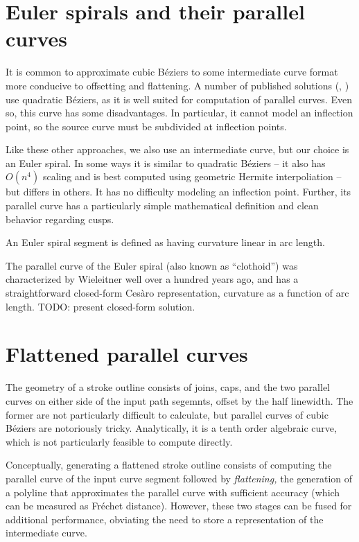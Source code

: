 \documentclass[sigconf, authordraft]{acmart}
\begin{document}
\section{Euler spirals and their parallel curves}

It is common to approximate cubic Béziers to some intermediate curve format more conducive to offsetting and flattening. A number of published solutions (\cite{Yzerman2020}, \cite{Nehab2020}) use quadratic Béziers, as it is well suited for computation of parallel curves. Even so, this curve has some disadvantages. In particular, it cannot model an inflection point, so the source curve must be subdivided at inflection points.

Like these other approaches, we also use an intermediate curve, but our choice is an Euler spiral. In some ways it is similar to quadratic Béziers -- it also has $O(n^4)$ scaling and is best computed using geometric Hermite interpoliation -- but differs in others. It has no difficulty modeling an inflection point. Further, its parallel curve has a particularly simple mathematical definition and clean behavior regarding cusps.

An Euler spiral segment is defined as having curvature linear in arc length.

The parallel curve of the Euler spiral (also known as ``clothoid'') was characterized by Wieleitner well over a hundred years ago\cite{Wieleitner1907}, and has a straightforward closed-form Cesàro representation, curvature as a function of arc length. TODO: present closed-form solution.

\section{Flattened parallel curves}

The geometry of a stroke outline consists of joins, caps, and the two parallel curves on either side of the input path segemnts, offset by the half linewidth. The former are not particularly difficult to calculate, but parallel curves of cubic Béziers are notoriously tricky. Analytically, it is a tenth order algebraic curve, which is not particularly feasible to compute directly.

Conceptually, generating a flattened stroke outline consists of computing the parallel curve of the input curve segment followed by \emph{flattening,} the generation of a polyline that approximates the parallel curve with sufficient accuracy (which can be measured as Fréchet distance). However, these two stages can be fused for additional performance, obviating the need to store a representation of the intermediate curve.
\end{document}
